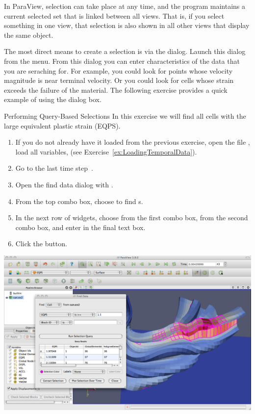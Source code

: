 In ParaView, selection can take place at any time, and the program
maintains a current selected set that is linked between all views.
That is, if you select something in one view, that selection is also
shown in all other views that display the same object.

The most direct means to create a selection is via the 
dialog. Launch this dialog from the  menu.  From this dialog you
can enter characteristics of the data that you are seraching for.  For
example, you could look for points whose velocity magnitude is near
terminal velocity.  Or you could look for cells whose strain exceeds the
failure of the material.  The following exercise provides a quick example
of using the  dialog box.

\begin{exercise}{Performing Query-Based Selections}
  \label{ex:PerformingQueryBasedSelections}%
  In this exercise we will find all cells with the large equivalent plastic
  strain (EQPS).

  \begin{enumerate}
  \item If you do not already have it loaded from the previous exercise,
    open the file , load all variables, \apply (see
    Exercise~\ref{ex:LoadingTemporalData}).
  \item Go to the last time step~\vcrLast.
  \item Open the find data dialog with  \ra {}.
  \item From the top combo box, choose to find s.
  \item In the next row of widgets, choose  from the first combo
    box,  from the second combo box, and enter  in the
    final text box.
  \item Click the  button.
  \end{enumerate}

  \begin{inlinefig}
    \includegraphics[width=\scw]{images/FindData}
  \end{inlinefig}


\end{exercise}
